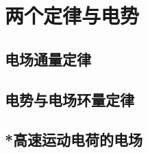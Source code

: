 

\section{两个定律与电势}\label{15-2}

\subsection{电场通量定律}\label{15-2-1}

\subsection{电势与电场环量定律}\label{15-2-2}

\subsection{*高速运动电荷的电场}\label{15-2-3}